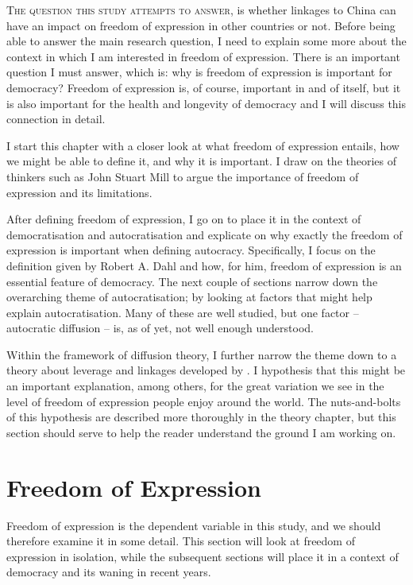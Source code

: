 \lettrine{T}{he question this study attempts to answer}, is whether linkages to China can have an impact on freedom of expression in other countries or not. Before being able to answer the main research question, I need to explain some more about the context in which I am interested in freedom of expression. There is an important question I must answer, which is: why is freedom of expression is important for democracy? Freedom of expression is, of course, important in and of itself, but it is also important for the health and longevity of democracy and I will discuss this connection in detail.  

I start this chapter with a closer look at what freedom of expression entails, how we might be able to define it, and why it is important.  I draw on the theories of thinkers such as John Stuart Mill to argue the importance of freedom of expression and its limitations.

After defining freedom of expression, I go on to place it in the context of democratisation and autocratisation and explicate on why exactly the freedom of expression is important when defining autocracy. Specifically, I focus on the definition given by Robert A. Dahl and how, for him, freedom of expression is an essential feature of democracy. The next couple of sections narrow down the overarching theme of autocratisation; by looking at factors that might help explain autocratisation. Many of these are well studied, but one factor -- autocratic diffusion -- is, as of yet, not well enough understood. 

Within the framework of diffusion theory, I further narrow the theme down to a theory about leverage and linkages developed by \citet{levitsky_linkage_2006}. I hypothesis that this might be an important explanation, among others, for the great variation we see in the level of freedom of expression people enjoy around the world. The nuts-and-bolts of this hypothesis are described more thoroughly in the theory chapter, but this section should serve to help the reader understand the ground I am working on. 

\section{Freedom of Expression}
Freedom of expression is the dependent variable in this study, and we should therefore examine it in some detail. This section will look at freedom of expression in isolation, while the subsequent sections will place it in a context of democracy and its waning in recent years. 

